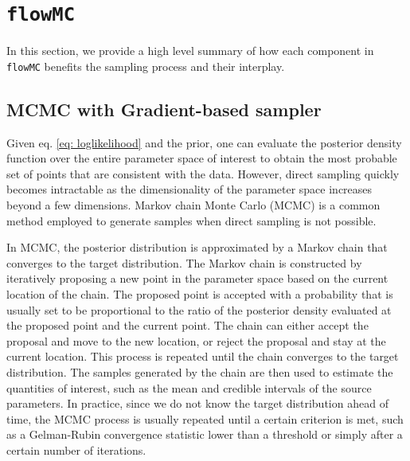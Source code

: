 \documentclass[twocolumn]{aastex631}
\begin{document}
\section{\texttt{flowMC}}
\label{sec: flowMC}

In this section, we provide a high level summary of how each component in
\texttt{flowMC} benefits the sampling process and their interplay.

\subsection{MCMC with Gradient-based sampler}
\label{sec:gradient}

Given eq. \ref{eq: loglikelihood} and the prior, one can evaluate the posterior
density function over the entire parameter space of interest to obtain the most
probable set of points that are consistent with the data. However, direct
sampling quickly becomes intractable as the dimensionality of the parameter
space increases beyond a few dimensions. Markov chain Monte Carlo (MCMC) is a
common method employed to generate samples when direct sampling is not possible.

In MCMC, the posterior distribution is approximated by a Markov chain that
converges to the target distribution. The Markov chain is constructed by
iteratively proposing a new point in the parameter space based on the current
location of the chain. The proposed point is accepted with a probability that is
usually set to be proportional to the ratio of the posterior density evaluated
at the proposed point and the current point. The chain can either accept the
proposal and move to the new location, or reject the proposal and stay at the
current location. This process is repeated until the chain converges to the
target distribution. The samples generated by the chain are then used to
estimate the quantities of interest, such as the mean and credible intervals of
the source parameters. In practice, since we do not know the target distribution
ahead of time, the MCMC process is usually repeated until a certain criterion is
met, such as a Gelman-Rubin convergence statistic \cite{Gelman-rhat} lower than
a threshold or simply after a certain number of iterations.
\end{document}
